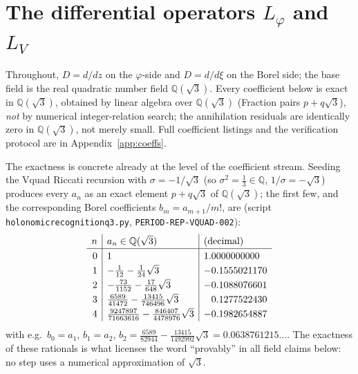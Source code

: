 \documentclass[11pt,reqno]{amsart}
\renewcommand{\_}{\vquadorigunderscore\allowbreak}
\theoremstyle{plain}
\theoremstyle{definition}
\newcommand{\Lphi}{L_{\varphi}}
\newcommand{\LV}{L_{V}}
\newcommand{\Qsqrt}{\mathbb{Q}(\sqrt3)}
\begin{document}
\section{The differential operators \texorpdfstring{$\Lphi$}{Lphi} and \texorpdfstring{$\LV$}{LV}}\label{sec:operators}

Throughout, $D=d/dz$ on the $\varphi$-side and $D=d/d\xi$ on the Borel side; the base field is
the real quadratic number field $\Qsqrt$. Every coefficient below is exact in $\Qsqrt$, obtained
by linear algebra over $\Qsqrt$ (Fraction pairs $p+q\sqrt3$), \emph{not} by numerical
integer-relation search; the annihilation residuals are identically zero in $\Qsqrt$, not merely
small. Full coefficient listings and the verification protocol are in
Appendix~\ref{app:coeffs}.

The exactness is concrete already at the level of the coefficient stream. Seeding the V\_quad
Riccati recursion with $\sigma=-1/\sqrt3$ (so $\sigma^2=\tfrac13\in\mathbb{Q}$,
$1/\sigma=-\sqrt3$) produces every $a_n$ as an exact element $p+q\sqrt3$ of $\Qsqrt$; the first
few, and the corresponding Borel coefficients $b_m=a_{m+1}/m!$, are
(script \texttt{holonomic\_recognition\_q3.py}, \texttt{PERIOD-REP-VQUAD-002}):
\begin{equation}\label{eq:coeffstream}
\renewcommand{\arraystretch}{1.25}
\begin{array}{r|l|l}
 n & a_n\in\Qsqrt & \text{(decimal)}\\\hline
 0 & 1 & 1.0000000000\\
 1 & -\tfrac{1}{12}-\tfrac{1}{24}\sqrt3 & -0.1555021170\\
 2 & -\tfrac{73}{1152}-\tfrac{17}{648}\sqrt3 & -0.1088076601\\
 3 & \tfrac{6589}{41472}-\tfrac{13415}{746496}\sqrt3 & \phantom{-}0.1277522430\\
 4 & \tfrac{9247897}{71663616}-\tfrac{846407}{4478976}\sqrt3 & -0.1982654887
\end{array}
\end{equation}
with e.g.\ $b_0=a_1$, $b_1=a_2$, $b_2=\tfrac{6589}{82944}-\tfrac{13415}{1492992}\sqrt3=
0.0638761215\ldots$. The exactness of these rationals is what licenses the word ``provably'' in
all field claims below: no step uses a numerical approximation of $\sqrt3$.
\end{document}
